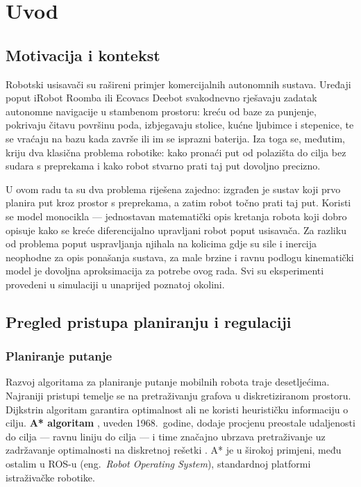 
\chapter{Uvod}
\label{pog:uvod}

\section{Motivacija i kontekst}

Robotski usisavači su rašireni primjer komercijalnih autonomnih sustava. Uređaji poput iRobot Roomba ili Ecovacs Deebot svakodnevno rješavaju zadatak autonomne navigacije u stambenom prostoru: kreću od baze za punjenje, pokrivaju čitavu površinu poda, izbjegavaju stolice, kućne ljubimce i stepenice, te se vraćaju na bazu kada završe ili im se isprazni baterija. Iza toga se, međutim, kriju dva klasična problema robotike: kako pronaći put od polazišta do cilja bez sudara s preprekama i kako robot stvarno prati taj put dovoljno precizno.

U ovom radu ta su dva problema riješena zajedno: izgrađen je sustav koji prvo planira put kroz prostor s preprekama, a zatim robot točno prati taj put. Koristi se model monocikla --- jednostavan matematički opis kretanja robota koji dobro opisuje kako se kreće diferencijalno upravljani robot poput usisavača. Za razliku od problema poput uspravljanja njihala na kolicima gdje su sile i inercija neophodne za opis ponašanja sustava, za male brzine i ravnu podlogu kinematički model je dovoljna aproksimacija za potrebe ovog rada. Svi su eksperimenti provedeni u simulaciji u unaprijed poznatoj okolini.

\section{Pregled pristupa planiranju i regulaciji}

\subsection{Planiranje putanje}

Razvoj algoritama za planiranje putanje mobilnih robota traje desetljećima. Najraniji pristupi temelje se na pretraživanju grafova u diskretiziranom prostoru. Dijkstrin algoritam garantira optimalnost ali ne koristi heurističku informaciju o cilju. \textbf{A* algoritam} \cite{hart1968astar}, uveden 1968.\ godine, dodaje procjenu preostale udaljenosti do cilja --- ravnu liniju do cilja --- i time značajno ubrzava pretraživanje uz zadržavanje optimalnosti na diskretnoj rešetki \cite{lavalle2006planning}. A* je u širokoj primjeni, među ostalim u ROS-u (eng.\ \textit{Robot Operating System}), standardnoj platformi istraživačke robotike.



